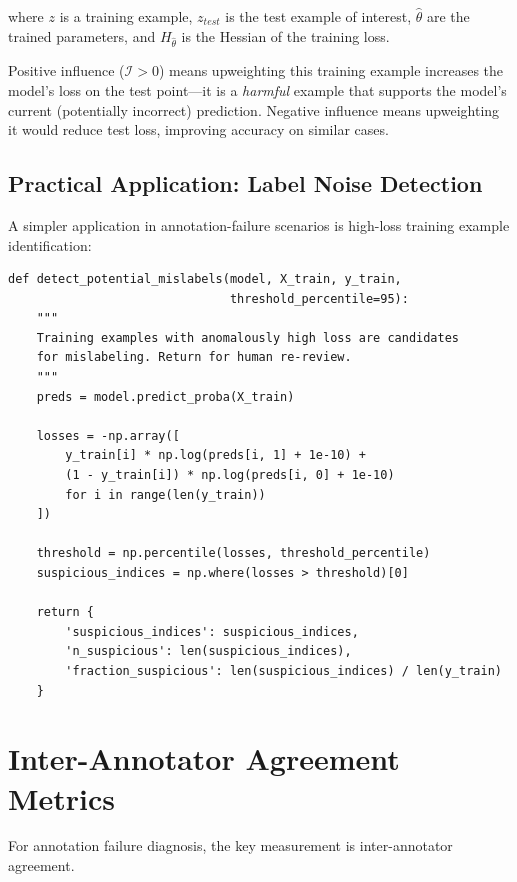 where $z$ is a training example, $z_{test}$ is the test example of interest, $\hat{\theta}$ are the trained parameters, and $H_{\hat{\theta}}$ is the Hessian of the training loss.

Positive influence ($\mathcal{I} > 0$) means upweighting this training example increases the model's loss on the test point---it is a \textit{harmful} example that supports the model's current (potentially incorrect) prediction. Negative influence means upweighting it would reduce test loss, improving accuracy on similar cases.

\subsection{Practical Application: Label Noise Detection}

A simpler application in annotation-failure scenarios is high-loss training example identification:

\begin{lstlisting}[style=python, caption={Label noise detection via training loss}]
def detect_potential_mislabels(model, X_train, y_train,
                               threshold_percentile=95):
    """
    Training examples with anomalously high loss are candidates
    for mislabeling. Return for human re-review.
    """
    preds = model.predict_proba(X_train)

    losses = -np.array([
        y_train[i] * np.log(preds[i, 1] + 1e-10) +
        (1 - y_train[i]) * np.log(preds[i, 0] + 1e-10)
        for i in range(len(y_train))
    ])

    threshold = np.percentile(losses, threshold_percentile)
    suspicious_indices = np.where(losses > threshold)[0]

    return {
        'suspicious_indices': suspicious_indices,
        'n_suspicious': len(suspicious_indices),
        'fraction_suspicious': len(suspicious_indices) / len(y_train)
    }
\end{lstlisting}

\section{Inter-Annotator Agreement Metrics}

For annotation failure diagnosis, the key measurement is inter-annotator agreement.

